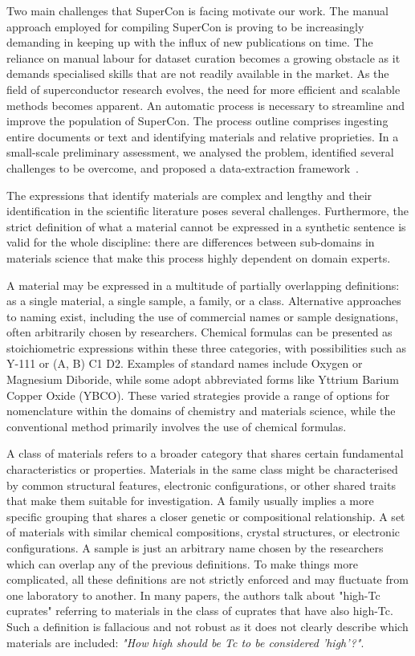 Two main challenges that SuperCon is facing motivate our work. 
The manual approach employed for compiling SuperCon is proving to be increasingly demanding in keeping up with the influx of new publications on time. The reliance on manual labour for dataset curation becomes a growing obstacle as it demands specialised skills that are not readily available in the market. As the field of superconductor research evolves, the need for more efficient and scalable methods becomes apparent.
An automatic process is necessary to streamline and improve the population of SuperCon. 
The process outline comprises ingesting entire documents or text and identifying materials and relative proprieties.  
In a small-scale preliminary assessment, we analysed the problem, identified several challenges to be overcome, and proposed a data-extraction framework~\cite{foppiano2019proposal}.

The expressions that identify materials are complex and lengthy and their identification in the scientific literature poses several challenges.
Furthermore, the strict definition of what a material cannot be expressed in a synthetic sentence is valid for the whole discipline: there are differences between sub-domains in materials science that make this process highly dependent on domain experts.

A material may be expressed in a multitude of partially overlapping definitions: as a single material, a single sample, a family, or a class.
Alternative approaches to naming exist, including the use of commercial names or sample designations, often arbitrarily chosen by researchers. Chemical formulas can be presented as stoichiometric expressions within these three categories, with possibilities such as Y-111 or (A, B) C1 D2. Examples of standard names include Oxygen or Magnesium Diboride, while some adopt abbreviated forms like Yttrium Barium Copper Oxide (YBCO). These varied strategies provide a range of options for nomenclature within the domains of chemistry and materials science, while the conventional method primarily involves the use of chemical formulas.

A class of materials refers to a broader category that shares certain fundamental characteristics or properties. Materials in the same class might be characterised by common structural features, electronic configurations, or other shared traits that make them suitable for investigation. 
A family usually implies a more specific grouping that shares a closer genetic or compositional relationship. A set of materials with similar chemical compositions, crystal structures, or electronic configurations. 
A sample is just an arbitrary name chosen by the researchers which can overlap any of the previous definitions. 
To make things more complicated, all these definitions are not strictly enforced and may fluctuate from one laboratory to another. 
In many papers, the authors talk about "high-Tc cuprates" referring to materials in the class of cuprates that have also high-Tc. Such a definition is fallacious and not robust as it does not clearly describe which materials are included: \textit{"How high should be Tc to be considered 'high'?"}.

